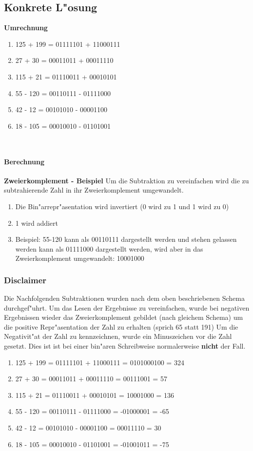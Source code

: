 \documentclass[a4paper,11pt,titlepage]{article}
\begin{document}
    \subsection{Konkrete L"osung}

    \noindent \textbf{Umrechnung}
    \begin{enumerate}
        \item 125 + 199 = 01111101 + 11000111
        \item 27 + 30 = 00011011 + 00011110
        \item 115 + 21 = 01110011 + 00010101
        \item 55 - 120 = 00110111 - 01111000
        \item 42 - 12 = 00101010 - 00001100
        \item 18 - 105 = 00010010 - 01101001
    \end{enumerate}
    \\ \\
    \noindent \textbf{Berechnung}
    \\ \\
    \noindent \textbf{Zweierkomplement - Beispiel}
    Um die Subtraktion zu vereinfachen wird die zu subtrahierende Zahl in ihr Zweierkomplement umgewandelt.
    \begin{enumerate}
        \item Die Bin"arrepr"asentation wird invertiert (0 wird zu 1 und 1 wird zu 0)
        \item 1 wird addiert
        \item Beispiel: 55-120
         kann als 00110111 dargestellt werden und stehen gelassen werden
         kann als 01111000 dargestellt werden, wird aber in das Zweierkomplement umgewandelt: 10001000
    \end{enumerate}

    \subsubsection{Disclaimer}
    Die Nachfolgenden Subtraktionen wurden nach dem oben beschriebenen Schema durchgef"uhrt. Um das Lesen der Ergebnisse zu vereinfachen, wurde bei negativen Ergebnissen wieder das Zweierkomplement gebildet (nach gleichem Schema) um die positive Repr"asentation der Zahl zu erhalten (sprich 65 statt 191)
    Um die Negativit"at der Zahl zu kennzeichnen, wurde ein Minuszeichen vor die Zahl gesetzt. Dies ist ist bei einer bin"aren Schreibweise normalerweise \textbf{nicht} der Fall.
    \begin{enumerate}
        \item 125 + 199 = 01111101 + 11000111 = 0101000100 = 324
        \item 27 + 30 = 00011011 + 00011110 = 00111001 = 57
        \item 115 + 21 = 01110011 + 00010101 = 10001000 = 136
        \item 55 - 120 = 00110111 - 01111000 = -01000001 = -65
        \item 42 - 12 = 00101010 - 00001100 = 00011110 = 30
        \item 18 - 105 = 00010010 - 01101001 = -01001011 = -75
    \end{enumerate}
    \\
\end{document}
